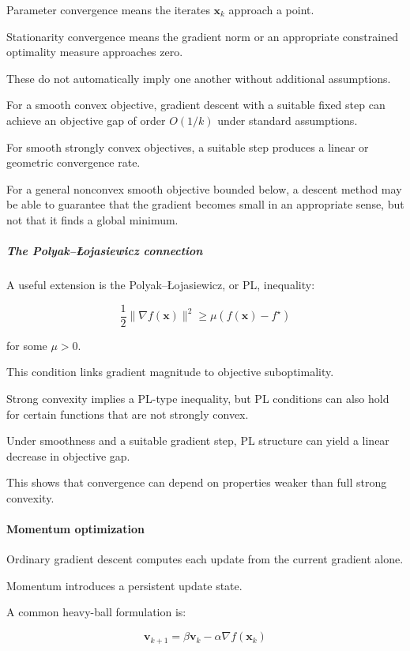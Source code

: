 Parameter convergence means the iterates \(\mathbf x_k\) approach a point.

Stationarity convergence means the gradient norm or an appropriate constrained optimality measure approaches zero.

These do not automatically imply one another without additional assumptions.

For a smooth convex objective, gradient descent with a suitable fixed step can achieve an objective gap of order \(O(1/k)\) under standard assumptions.

For smooth strongly convex objectives, a suitable step produces a linear or geometric convergence rate.

For a general nonconvex smooth objective bounded below, a descent method may be able to guarantee that the gradient becomes small in an appropriate sense, but not that it finds a global minimum.

\subparagraph{The Polyak--Łojasiewicz connection}\label{the-polyakux142ojasiewicz-connection}

A useful extension is the Polyak--Łojasiewicz, or PL, inequality:

\[
\frac12\|\nabla f(\mathbf x)\|^2 \ge \mu(f(\mathbf x)-f^\star)
\]

for some \(\mu>0\).

This condition links gradient magnitude to objective suboptimality.

Strong convexity implies a PL-type inequality, but PL conditions can also hold for certain functions that are not strongly convex.

Under smoothness and a suitable gradient step, PL structure can yield a linear decrease in objective gap.

This shows that convergence can depend on properties weaker than full strong convexity.

\paragraph{Momentum optimization}\label{momentum-optimization}

Ordinary gradient descent computes each update from the current gradient alone.

Momentum introduces a persistent update state.

A common heavy-ball formulation is:

\[
\boxed{ \mathbf v_{k+1} = \beta\mathbf v_k-\alpha\nabla f(\mathbf x_k) }
\]

